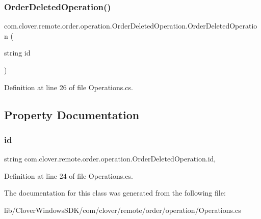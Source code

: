\subsubsection{\texorpdfstring{Order\+Deleted\+Operation()}{OrderDeletedOperation()}\hspace{0.1cm}{\footnotesize\ttfamily [2/2]}}
{\footnotesize\ttfamily com.\+clover.\+remote.\+order.\+operation.\+Order\+Deleted\+Operation.\+Order\+Deleted\+Operation (\begin{DoxyParamCaption}\item[{string}]{id }\end{DoxyParamCaption})}



Definition at line 26 of file Operations.\+cs.



\subsection{Property Documentation}
\mbox{\label{classcom_1_1clover_1_1remote_1_1order_1_1operation_1_1_order_deleted_operation_a9a68575627e956f9593dbf0e0171a3ae}} 
\subsubsection{\texorpdfstring{id}{id}}
{\footnotesize\ttfamily string com.\+clover.\+remote.\+order.\+operation.\+Order\+Deleted\+Operation.\+id\hspace{0.3cm}{\ttfamily [get]}, {\ttfamily [set]}}



Definition at line 24 of file Operations.\+cs.



The documentation for this class was generated from the following file\+:\begin{DoxyCompactItemize}
\item 
lib/\+Clover\+Windows\+S\+D\+K/com/clover/remote/order/operation/Operations.\+cs\end{DoxyCompactItemize}
